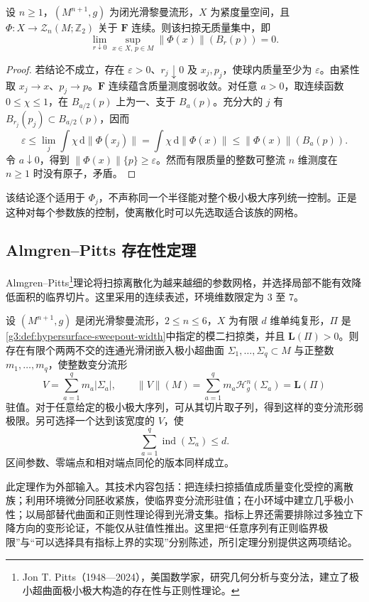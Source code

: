 \begin{proposition}\label{g3:prop:F-sweepout-no-concentration}
	设 \(n\ge1\)，\((M^{n+1},g)\) 为闭光滑黎曼流形，\(X\) 为紧度量空间，且 \(\Phi:X\to\mathcal Z_n(M;\mathbb Z_2)\) 关于 \(\mathbf F\) 连续。则该扫掠无质量集中，即
	\[
		\lim_{r\downarrow0}\sup_{x\in X,\,p\in M}
		\|\Phi(x)\|(B_r(p))=0.
	\]
\end{proposition}
\begin{proof}
	若结论不成立，存在 \(\varepsilon>0\)、\(r_j\downarrow0\) 及 \(x_j,p_j\)，使球内质量至少为 \(\varepsilon\)。由紧性取 \(x_j\to x\)、\(p_j\to p\)。\(\mathbf F\) 连续蕴含质量测度弱收敛。对任意 \(a>0\)，取连续函数 \(0\le\chi\le1\)，在 \(B_{a/2}(p)\) 上为一、支于 \(B_a(p)\)。充分大的 \(j\) 有 \(B_{r_j}(p_j)\subset B_{a/2}(p)\)，因而
	\[
		\varepsilon\le\lim_j\int\chi\,\mathrm d\|\Phi(x_j)\|
		=\int\chi\,\mathrm d\|\Phi(x)\|\le\|\Phi(x)\|(B_a(p)).
	\]
	令 \(a\downarrow0\)，得到 \(\|\Phi(x)\|\{p\}\ge\varepsilon\)。然而有限质量的整数可整流 \(n\) 维测度在 \(n\ge1\) 时没有原子，矛盾。
\end{proof}
该结论逐个适用于 \(\Phi_j\)，不声称同一个半径能对整个极小极大序列统一控制。正是这种对每个参数族的控制，使离散化时可以先选取适合该族的网格。

\subsection{Almgren–Pitts 存在性定理}
\label{g3:subsec:2305:05}
Almgren--Pitts\footnote{Jon T. Pitts（1948—2024），美国数学家，研究几何分析与变分法，建立了极小超曲面极小极大构造的存在性与正则性理论。}理论将扫掠离散化为越来越细的参数网格，并选择局部不能有效降低面积的临界切片。这里采用\cite[定理3.8，第471--473页；定理1.2，第465页]{MarquesNeves2016IndexMultiplicity}的连续表述，环境维数限定为 \(3\) 至 \(7\)。

\begin{theorem}\label{g3:thm:almgren-pitts-selected}
	设 \((M^{n+1},g)\) 是闭光滑黎曼流形，\(2\le n\le6\)，\(X\) 为有限 \(d\) 维单纯复形，\(\Pi\) 是\cref{g3:def:hypersurface-sweepout-width}中指定的模二扫掠类，并且 \(\mathbf L(\Pi)>0\)。则存在有限个两两不交的连通光滑闭嵌入极小超曲面 \(\Sigma_1,\ldots,\Sigma_q\subset M\) 与正整数 \(m_1,\ldots,m_q\)，使整数变分流形
	\[
		V=\sum_{a=1}^q m_a|\Sigma_a|,
		\qquad
		\|V\|(M)=\sum_{a=1}^q m_a\mathcal H_g^n(\Sigma_a)=\mathbf L(\Pi)
	\]
	驻值。对于任意给定的极小极大序列，可从其切片取子列，得到这样的变分流形弱极限。另可选择一个达到该宽度的 \(V\)，使
	\[
		\sum_{a=1}^q\operatorname{ind}(\Sigma_a)\le d.
	\]
	区间参数、零端点和相对端点同伦的版本同样成立。
\end{theorem}
此定理作为外部输入。其技术内容包括：把连续扫掠插值成质量变化受控的离散族；利用环境微分同胚收紧族，使临界变分流形驻值；在小环域中建立几乎极小性；以局部替代曲面和正则性理论得到光滑支集。指标上界还需要排除过多独立下降方向的变形论证，不能仅从驻值性推出。这里把“任意序列有正则临界极限”与“可以选择具有指标上界的实现”分别陈述，所引定理分别提供这两项结论。

